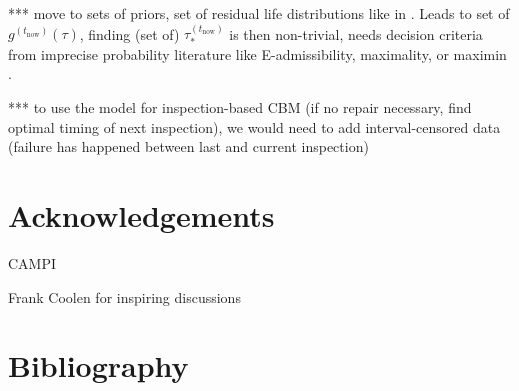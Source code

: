 \documentclass[authoryear]{elsarticle}
\def\tnow{t_\text{now}}
\newcommand{\gnow}{g^{(\tnow)}}
\newcommand{\tausnow}{\tau_*^{(\tnow)}}
\begin{document}
*** move to sets of priors, set of residual life distributions like in \cite{2016:walter-coolen}.
Leads to set of $\gnow(\tau)$, finding (set of) $\tausnow$ is then non-trivial,
needs decision criteria from imprecise probability literature like E-admissibility, maximality, or maximin
\citep[see, e.g., \S 9***][]{itip}.

*** to use the model for inspection-based CBM (if no repair necessary, find optimal timing of next inspection),
we would need to add interval-censored data (failure has happened between last and current inspection)




\section*{Acknowledgements}

CAMPI

Frank Coolen for inspiring discussions

\section*{Bibliography}




\end{document}
